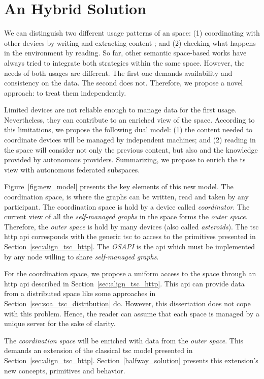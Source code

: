 \section{An Hybrid Solution} %
\label{sec:hybrid_solution}

We can distinguish two different usage patterns of an space:
(1) coordinating with other devices by writing and extracting content ; and %
(2) checking what happens in the environment by reading.
So far, other semantic space-based works have always tried to integrate both strategies within the same space.
However, the needs of both usages are different.
The first one demands availability and consistency on the data.
The second does not. %
Therefore, we propose a novel approach: to treat them independently.


Limited devices are not reliable enough to manage data for the first usage.
Nevertheless, they can contribute to an enriched view of the space.
According to this limitations, we propose the following dual model:
(1) the content needed to coordinate devices will be managed by independent machines; and
(2) reading in the space will consider not only the previous content, but also and the knowledge provided by autonomous providers.
Summarizing, we propose to enrich the \ac{ts} view with autonomous federated subspaces.


Figure~\ref{fig:new_model} presents the key elements of this new model.
The coordination space, is where the graphs can be written, read and taken by any participant.
The coordination space is hold by a device called \emph{coordinator}.
The current view of all the \emph{self-managed graphs} in the space forms the \emph{outer space}.
Therefore, the \emph{outer space} is hold by many devices (also called \emph{asteroids}).
The \ac{tsc} \ac{http} \ac{api} corresponds with the generic \ac{tsc} to access to the primitives presented in Section~\ref{sec:align_tsc_http}.
The \emph{OSAPI} is the \ac{api} which must be implemented by any node willing to share \emph{self-managed graphs}.




For the coordination space, we propose a uniform access to the space through an \acs{http} \ac{api} described in Section~\ref{sec:align_tsc_http}.
This \ac{api} can provide data from a distributed space like some approaches in Section~\ref{sec:soa_tsc_distribution} do.
However, this dissertation does not cope with this problem. %
Hence, the reader can assume that each space is managed by a unique server for the sake of clarity.


The \emph{coordination space} will be enriched with data from the \emph{outer space}. %
This demands an extension of the classical \ac{tsc} model presented in Section~\ref{sec:align_tsc_http}.
Section~\ref{halfway_solution} presents this extension's new concepts, primitives and behavior.